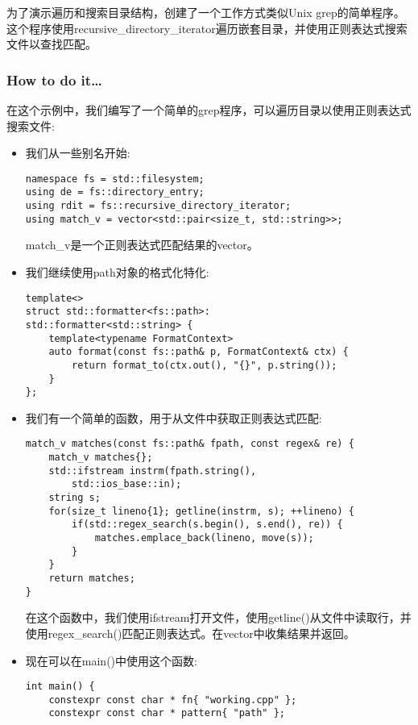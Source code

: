 
为了演示遍历和搜索目录结构，创建了一个工作方式类似Unix grep的简单程序。这个程序使用recursive\_directory\_iterator遍历嵌套目录，并使用正则表达式搜索文件以查找匹配。

\subsubsection{How to do it…}

在这个示例中，我们编写了一个简单的grep程序，可以遍历目录以使用正则表达式搜索文件:

\begin{itemize}
\item 
我们从一些别名开始:

\begin{lstlisting}[style=styleCXX]
namespace fs = std::filesystem;
using de = fs::directory_entry;
using rdit = fs::recursive_directory_iterator;
using match_v = vector<std::pair<size_t, std::string>>;
\end{lstlisting}

match\_v是一个正则表达式匹配结果的vector。

\item 
我们继续使用path对象的格式化特化:

\begin{lstlisting}[style=styleCXX]
template<>
struct std::formatter<fs::path>:
std::formatter<std::string> {
	template<typename FormatContext>
	auto format(const fs::path& p, FormatContext& ctx) {
		return format_to(ctx.out(), "{}", p.string());
	}
};
\end{lstlisting}

\item 
我们有一个简单的函数，用于从文件中获取正则表达式匹配:

\begin{lstlisting}[style=styleCXX]
match_v matches(const fs::path& fpath, const regex& re) {
	match_v matches{};
	std::ifstream instrm(fpath.string(),
		std::ios_base::in);
	string s;
	for(size_t lineno{1}; getline(instrm, s); ++lineno) {
		if(std::regex_search(s.begin(), s.end(), re)) {
			matches.emplace_back(lineno, move(s));
		}
	}
	return matches;
}
\end{lstlisting}

在这个函数中，我们使用ifstream打开文件，使用getline()从文件中读取行，并使用regex\_search()匹配正则表达式。在vector中收集结果并返回。

\item 
现在可以在main()中使用这个函数:

\begin{lstlisting}[style=styleCXX]
int main() {
	constexpr const char * fn{ "working.cpp" };
	constexpr const char * pattern{ "path" };
	

\end{lstlisting}
\end{itemize}
